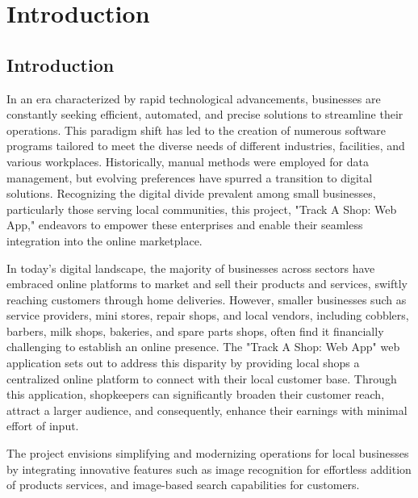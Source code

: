 
\chapter{Introduction} %

\label{Chapter1} %



\section{Introduction}
In an era characterized by rapid technological advancements, businesses are constantly seeking efficient, automated, and precise solutions to streamline their operations. This paradigm shift has led to the creation of numerous software programs tailored to meet the diverse needs of different industries, facilities, and various workplaces. Historically, manual methods were employed for data management, but evolving preferences have spurred a transition to digital solutions. Recognizing the digital divide prevalent among small businesses, particularly those serving local communities, this project, "Track A Shop: Web App," endeavors to empower these enterprises and enable their seamless integration into the online marketplace.

In today's digital landscape, the majority of businesses across sectors have embraced online platforms to market and sell their products and services, swiftly reaching customers through home deliveries. However, smaller businesses such as service providers, mini stores, repair shops, and local vendors, including cobblers, barbers, milk shops, bakeries, and spare parts shops, often find it financially challenging to establish an online presence. The "Track A Shop: Web App" web application sets out to address this disparity by providing local shops a centralized online platform to connect with their local customer base. Through this application, shopkeepers can significantly broaden their customer reach, attract a larger audience, and consequently, enhance their earnings with minimal effort of input.

The project envisions simplifying and modernizing operations for local businesses by integrating innovative features such as image recognition for effortless addition of products services, and image-based search capabilities for customers.

